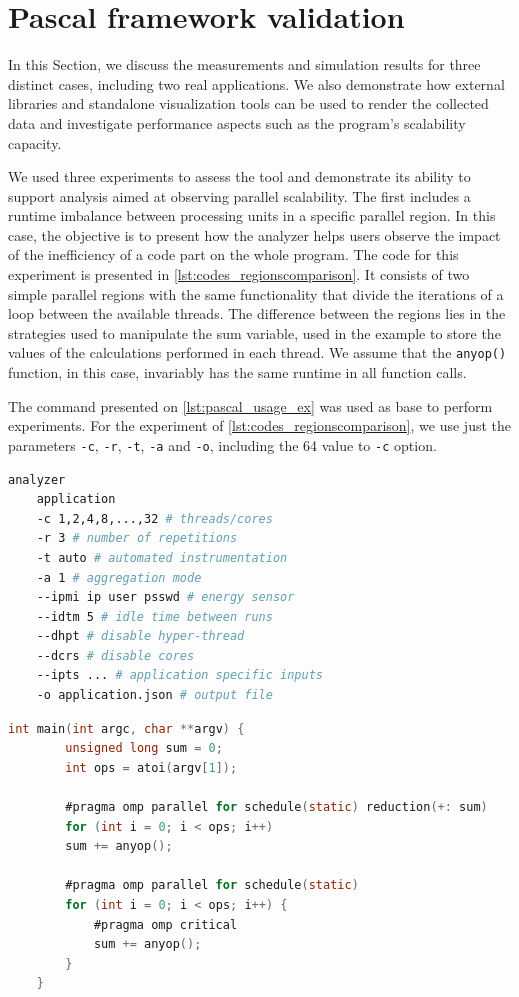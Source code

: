 \section{Pascal framework validation} \label{sec:pascal_framework_validation}
In this Section, we discuss the measurements and simulation results for three distinct cases, including two real applications. We also demonstrate how external libraries and standalone visualization tools can be used to render the collected data and investigate performance aspects such as the program's scalability capacity.

We used three experiments to assess the tool and demonstrate its ability to support analysis aimed at observing parallel scalability. The first includes a runtime imbalance between processing units in a specific parallel region. In this case, the objective is to present how the analyzer helps users observe the impact of the inefficiency of a code part on the whole program. The code for this experiment is presented in \cref{lst:codes_regionscomparison}. It consists of two simple parallel regions with the same functionality that divide the iterations of a loop between the available threads. The difference between the regions lies in the strategies used to manipulate the sum variable, used in the example to store the values of the calculations performed in each thread. We assume that the {\tt anyop()} function, in this case, invariably has the same runtime in all function calls.

The command presented on \cref{lst:pascal_usage_ex} was used as base to perform experiments. For the experiment of \cref{lst:codes_regionscomparison}, we use just the parameters {\tt -c}, {\tt -r}, {\tt -t}, {\tt -a} and {\tt -o}, including the 64 value to {\tt -c} option.

\lstset{style=ccodestyle, frame=tb}
\begin{lstlisting}[label={lst:pascal_usage_ex}, language=bash, caption={Command line showing how experiments were run through a terminal.}]
	analyzer 
	application
	-c 1,2,4,8,...,32 # threads/cores
	-r 3 # number of repetitions
	-t auto # automated instrumentation
	-a 1 # aggregation mode
	--ipmi ip user psswd # energy sensor
	--idtm 5 # idle time between runs
	--dhpt # disable hyper-thread
	--dcrs # disable cores
	--ipts ... # application specific inputs
	-o application.json # output file
\end{lstlisting}

\lstset{style=ccodestyle, frame=tb}
\begin{lstlisting}[label={lst:codes_regionscomparison}, language=C, caption={Sample code used to visualize the impact of regions on program scalability.}]
	int main(int argc, char **argv) {
		unsigned long sum = 0;
		int ops = atoi(argv[1]);
		
		#pragma omp parallel for schedule(static) reduction(+: sum)
		for (int i = 0; i < ops; i++)
		sum += anyop();
		
		#pragma omp parallel for schedule(static)
		for (int i = 0; i < ops; i++) {
			#pragma omp critical
			sum += anyop();
		}
	}
\end{lstlisting}

